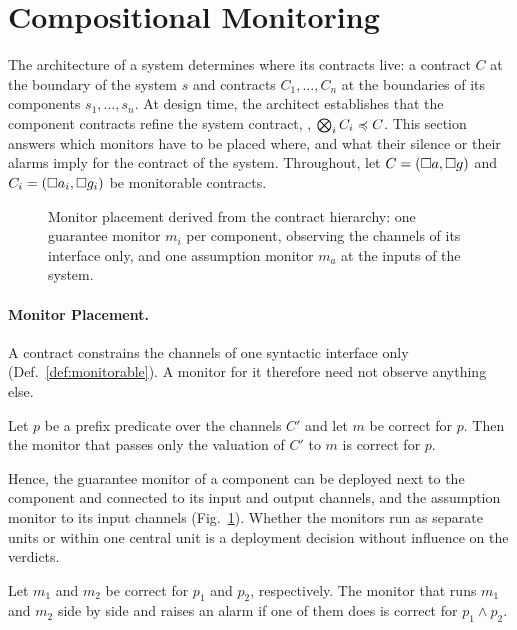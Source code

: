 \section{Compositional Monitoring}\label{sec:compositional}

The architecture of a system determines where its contracts live: a contract $C$ at the boundary of the system $s$ and contracts $C_1, \dots, C_n$ at the boundaries of its components $s_1, \dots, s_n$. At design time, the architect establishes that the component contracts refine the system contract, \ie, $\bigotimes_i C_i \preccurlyeq C$. This section answers which monitors have to be placed where, and what their silence or their alarms imply for the contract of the system. Throughout, let $C = (\Box a,\Box g)$ and $C_i = (\Box a_i,\Box g_i)$ be monitorable contracts.

\begin{figure}[t]
  \centering
  
  \caption{Monitor placement derived from the contract hierarchy: one guarantee monitor $m_i$ per component, observing the channels of its interface only, and one assumption monitor $m_a$ at the inputs of the system.}
  \label{fig:placement}
\end{figure}

\paragraph{Monitor Placement.}
A contract constrains the channels of one syntactic interface only (Def.~\ref{def:monitorable}). A monitor for it therefore need not observe anything else.

\begin{lemma}\label{lem:local}
  Let $p$ be a prefix predicate over the channels $C'$ and let $m$ be correct for $p$. Then the monitor that passes only the valuation of $C'$ to $m$ is correct for $p$.
\end{lemma}

\noindent
Hence, the guarantee monitor of a component can be deployed next to the component and connected to its input and output channels, and the assumption monitor to its input channels (Fig.~\ref{fig:placement}). Whether the monitors run as separate units or within one central unit is a deployment decision without influence on the verdicts.

\begin{lemma}\label{lem:central}
  Let $m_1$ and $m_2$ be correct for $p_1$ and $p_2$, respectively. The monitor that runs $m_1$ and $m_2$ side by side and raises an alarm if one of them does is correct for $p_1 \land p_2$.
\end{lemma}

